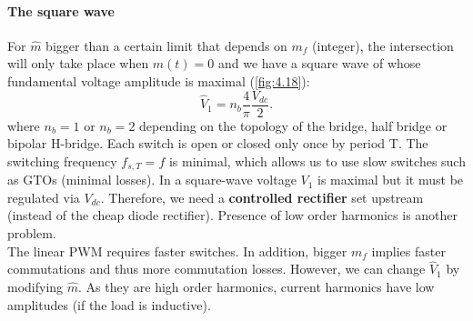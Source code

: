 		\paragraph{The square wave}\quad For $\hat{m}$ bigger than a certain limit that depends on $m_f$ (integer), the intersection will only take place when $m(t)=0$ and we have a square wave of whose fundamental voltage amplitude is maximal (\autoref{fig:4.18}):
		\begin{equation}
			\hat{V}_{1} = n_b \frac{4}{\pi}\frac{V_{dc}}{2}. 
		\end{equation}		  
		where $n_b = 1$ or $n_b = 2$ depending on the topology of the bridge, half bridge or bipolar H-bridge. Each switch is open or closed only once by period T. The switching frequency $f_{s,T} = f$ is minimal, which allows us to use slow switches such as GTOs (minimal losses). In a square-wave voltage $V_1$ is maximal but it must be regulated via $V_{dc}$. Therefore, we need a \textbf{controlled rectifier} set upstream (instead of the cheap diode rectifier). Presence of low order harmonics is another problem. \\
		
		The linear PWM requires faster switches. In addition, bigger $m_f$ implies faster commutations and thus more commutation losses. However, we can change $\hat{V}_1$ by modifying $\hat{m}$. As they are high order harmonics, current harmonics have low amplitudes (if the load is inductive). 
		
